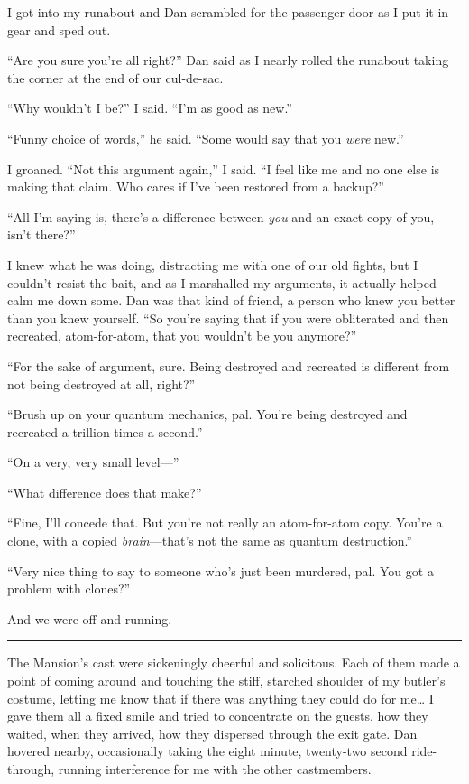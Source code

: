 I got into my runabout and Dan scrambled for the passenger door as
I put it in gear and sped out.

“Are you sure you're all right?” Dan said as I nearly rolled the
runabout taking the corner at the end of our cul-de-sac.

“Why wouldn't I be?” I said. “I'm as good as new.”

“Funny choice of words,” he said. “Some would say that you
\emph{were} new.”

I groaned. “Not this argument again,” I said. “I feel like me and
no one else is making that claim. Who cares if I've been restored
from a backup?”

“All I'm saying is, there's a difference between \emph{you} and an
exact copy of you, isn't there?”

I knew what he was doing, distracting me with one of our old
fights, but I couldn't resist the bait, and as I marshalled my
arguments, it actually helped calm me down some. Dan was that kind
of friend, a person who knew you better than you knew yourself. “So
you're saying that if you were obliterated and then recreated,
atom-for-atom, that you wouldn't be you anymore?”

“For the sake of argument, sure. Being destroyed and recreated is
different from not being destroyed at all, right?”

“Brush up on your quantum mechanics, pal. You're being destroyed
and recreated a trillion times a second.”

“On a very, very small level—”

“What difference does that make?”

“Fine, I'll concede that. But you're not really an atom-for-atom
copy. You're a clone, with a copied \emph{brain}—that's not the
same as quantum destruction.”

“Very nice thing to say to someone who's just been murdered, pal.
You got a problem with clones?”

And we were off and running.

\begin{center}\rule{3in}{0.4pt}\end{center}

The Mansion's cast were sickeningly cheerful and solicitous. Each
of them made a point of coming around and touching the stiff,
starched shoulder of my butler's costume, letting me know that if
there was anything they could do for me… I gave them all a fixed
smile and tried to concentrate on the guests, how they waited, when
they arrived, how they dispersed through the exit gate. Dan hovered
nearby, occasionally taking the eight minute, twenty-two second
ride-through, running interference for me with the other
castmembers.

